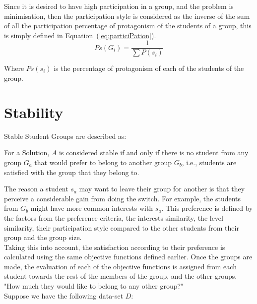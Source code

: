 Since it is desired to have high participation in a group, and the problem is minimisation, then the participation style is considered as the inverse of the sum of all the participation percentage of protagonism of the students of a group, this is simply defined in Equation~(\ref{eq:particiPation}).\\

\begin{equation}
    \label{eq:particiPation}
    Ps(G_i) = \frac{1}{\sum P(s_i)} 
\end{equation}

Where $Ps(s_i)$ is the percentage of protagonism of each of the students of the group. \\

\section{Stability}
\label{section:stability}

Stable Student Groups are described as:

\begin{definition}
    For a Solution, $A$ is considered stable if and only if there is no student from any group $G_a$ that would prefer to belong to another group $G_b$, i.e., students are satisfied with the group that they belong to.
\end{definition}

The reason a student $s_a$ may want to leave their group for another is that they perceive a considerable gain from doing the switch. For example, the students from $G_b$ might have more common interests with $s_a$. This preference is defined by the factors from the preference criteria, the interests similarity, the level similarity, their participation style compared to the other students from their group and the group size.\\

Taking this into account, the satisfaction according to their preference is calculated using the same objective functions defined earlier. Once the groups are made, the evaluation of each of the objective functions is assigned from each student towards the rest of the members of the group, and the other groups. "How much they would like to belong to any other group?"\\

Suppose we have the following data-set $D$:\\

